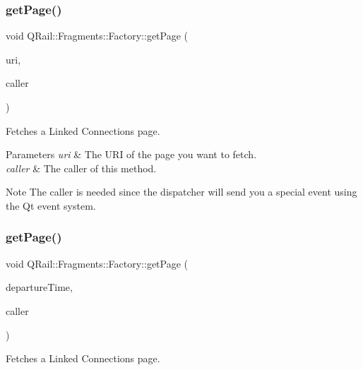 \subsubsection{\texorpdfstring{getPage()}{getPage()}\hspace{0.1cm}{\footnotesize\ttfamily [1/2]}}
{\footnotesize\ttfamily void Q\+Rail\+::\+Fragments\+::\+Factory\+::get\+Page (\begin{DoxyParamCaption}\item[{const Q\+Url \&}]{uri,  }\item[{Q\+Object $\ast$}]{caller }\end{DoxyParamCaption})}



Fetches a Linked Connections page. 


\begin{DoxyParams}{Parameters}
{\em uri} & The U\+RI of the page you want to fetch. \\
\hline
{\em caller} & The caller of this method. \\
\hline
\end{DoxyParams}
\begin{DoxyNote}{Note}
The caller is needed since the dispatcher will send you a special event using the Qt event system. 
\end{DoxyNote}
\mbox{\label{classQRail_1_1Fragments_1_1Factory_a9a1ad3f27d325db60b7221fe4124353a}} 
\subsubsection{\texorpdfstring{getPage()}{getPage()}\hspace{0.1cm}{\footnotesize\ttfamily [2/2]}}
{\footnotesize\ttfamily void Q\+Rail\+::\+Fragments\+::\+Factory\+::get\+Page (\begin{DoxyParamCaption}\item[{const Q\+Date\+Time \&}]{departure\+Time,  }\item[{Q\+Object $\ast$}]{caller }\end{DoxyParamCaption})}



Fetches a Linked Connections page. 


